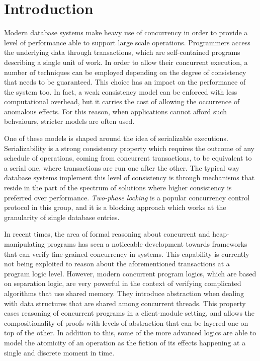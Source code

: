 \chapter{Introduction}

Modern database systems make heavy use of concurrency in order to provide a level of performance able to support large scale operations. Programmers access the underlying data through transactions, which are self-contained programs describing a single unit of work. In order to allow their concurrent execution, a number of techniques can be employed depending on the degree of consistency that needs to be guaranteed. This choice has an impact on the performance of the system too. In fact, a weak consistency model can be enforced with less computational overhead, but it carries the cost of allowing the occurrence of anomalous effects. For this reason, when applications cannot afford such behvaiours, stricter models are often used.

One of these models is shaped around the idea of serializable executions. Serializability is a strong consistency property which requires the outcome of any schedule of operations, coming from concurrent transactions, to be equivalent to a serial one, where transactions are run one after the other. The typical way database systems implement this level of consistency is through mechanisms that reside in the part of the spectrum of solutions where higher consistency is preferred over performance. \textit{Two-phase locking} is a popular concurrency control protocol in this group, and it is a blocking approach which works at the granularity of single database entries.

In recent times, the area of formal reasoning about concurrent and heap-manipulating programs has seen a noticeable development towards frameworks that can verify fine-grained concurrency in systems. This capability is currently not being exploited to reason about the aforementioned transactions at a program logic level. However, modern concurrent program logics, which are based on separation logic, are very powerful in the context of verifying complicated algorithms that use shared memory. They introduce abstraction when dealing with data structures that are shared among concurrent threads. This property eases reasoning of concurrent programs in a client-module setting, and allows the compositionality of proofs with levels of abstraction that can be layered one on top of the other. In addition to this, some of the more advanced logics are able to model the atomicity of an operation as the fiction of its effects happening at a single and discrete moment in time.

